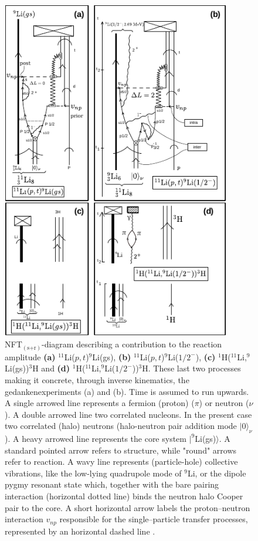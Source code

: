           \begin{figure}
          \centerline {
          \includegraphics*[width=10cm]{introduccion/figs/fig1_9_3xxx}
          }
          \caption{ NFT$_{(\text{s+r})}$-diagram  describing a contribution to the reaction amplitude \textbf{(a)} $^{11}$Li($p,t$)$^9$Li(gs), \textbf{(b)} $^{11}$Li($p,t$)$^9$Li($1/2^-$), \textbf{(c)}  $^{1}$H($^{11}$Li,$^9$Li(gs))$^3$H and \textbf{(d)} $^{1}$H($^{11}$Li,$^9$Li($1/2^-$))$^3$H. These last two processes making it concrete, through inverse kinematics, the gedankenexperiments (a) and (b). Time is assumed to run upwards.
              	A single arrowed line represents a fermion (proton) ($\pi$) or neutron ($\nu$). A double arrowed line  two correlated nucleons. In the present case two correlated (halo) neutrons (halo-neutron pair addition mode $|0\rangle_{\nu}$). A heavy arrowed line represents  the core system $|^9$Li(gs)$\rangle$. A standard 
              	pointed arrow refers to structure, while "round" arrows refer to reaction. A wavy line represents (particle-hole) collective vibrations,
              	 like the low-lying quadrupole mode of $^9$Li, or the  dipole pygmy resonant state  which, together  with the bare pairing interaction (horizontal dotted line) binds the neutron  halo Cooper pair to the core.  A short horizontal arrow labels the proton--neutron interaction $v_{np}$ responsible for  the single--particle transfer  processes, represented by an horizontal dashed line .
}
\end{figure}

